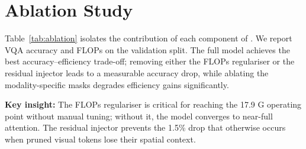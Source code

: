 
\section{Ablation Study}

Table~\ref{tab:ablation} isolates the contribution of each component
of \modelname{}. We report VQA accuracy and FLOPs on the \dataset{}
validation split. The full model achieves the best accuracy--efficiency
trade-off; removing either the FLOPs regulariser or the residual
injector leads to a measurable accuracy drop, while ablating the
modality-specific masks degrades efficiency gains significantly.

\begin{table}[H]
  \centering
  \small
  \caption{%
    \textbf{Component ablation on \dataset{} VQA.}
    \checkmark\ denotes component enabled; \(\times\) denotes removed.
    Residual inj.\ = residual injector for pruned tokens.
  }
  \label{tab:ablation}
  \setlength{\tabcolsep}{5pt}
  \renewcommand{\arraystretch}{1.2}
\end{table}

\noindent
\textbf{Key insight:} The FLOPs regulariser is critical for reaching
the 17.9 G operating point without manual tuning; without it, the model
converges to near-full attention. The residual injector prevents the
1.5\% drop that otherwise occurs when pruned visual tokens lose their
spatial context.


